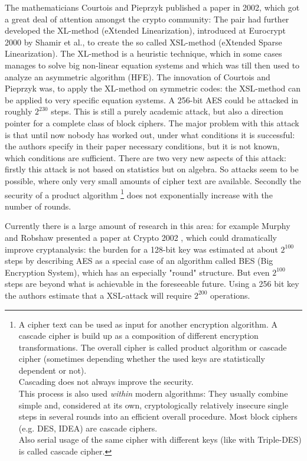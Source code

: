 The mathematicians Courtois and Pieprzyk \cite{Courtois2002} published a paper
in 2002, which got a great deal of attention amongst the crypto community: The
pair had further developed the XL-method (eXtended Linearization), introduced at
Eurocrypt 2000 by Shamir et al., to create the so called XSL-method (eXtended
Sparse Linearization). The XL-method is a heuristic technique, which in some
cases manages to solve big non-linear equation systems and which was till then
used to analyze an asymmetric algorithm (HFE).  The innovation of Courtois and
Pieprzyk was, to apply the XL-method on symmetric codes: the XSL-method can be
applied to very specific equation systems. A 256-bit AES could be attacked in
roughly $2^{230}$ steps. This is still a purely academic attack, but also a
direction pointer for a complete class of block ciphers. The major problem with
this attack is that until now nobody has worked out, under what conditions it is
successful: the authors specify in their paper necessary conditions, but it is
not known, which conditions are sufficient.  There are two very new aspects of
this attack: firstly this attack is not based on statistics but on algebra. So
attacks seem to be possible, where only very small amounts of cipher text are
available. Secondly the security of a product algorithm%
\footnote{%
A cipher text can be used as input for another encryption algorithm. 
A cascade cipher is build up as a composition of different encryption 
transformations. The overall cipher is called product algorithm or cascade cipher (sometimes depending whether the used keys are statistically dependent or not).\\
Cascading does not always improve the security.\\
This process is also used {\em within} modern algorithms:
They usually combine simple and, considered at its own, cryptologically
relatively insecure single steps in several rounds into an efficient 
overall procedure.  Most block ciphers (e.g. DES, IDEA) are cascade ciphers.\\
Also serial usage of the same cipher with different keys (like with Triple-DES)
is called cascade cipher. 
}
does not exponentially increase with the number of rounds.

Currently there is a large amount of research in this area: for example Murphy and Robshaw presented a paper at Crypto 2002 \cite{Robshaw2002a}, which could dramatically improve cryptanalysis: the burden for a 128-bit key was estimated at about $2^{100}$ steps by describing AES as a special case of an algorithm called BES (Big Encryption System), which has an especially "round" structure. But even $2^{100}$ steps are beyond what is achievable in the foreseeable future. Using a 256 bit key the authors estimate that a XSL-attack will require $2^{200}$ operations.

